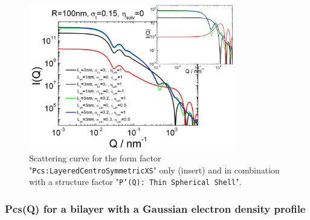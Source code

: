 \begin{figure}[htb]
\begin{center}
\includegraphics[width=0.8\textwidth,height=0.55\textwidth]{../images/form_factor/anisotropic/Pcs_planar2centrosymmIQ.png}
\end{center}
\caption{Scattering curve for the form factor "\texttt{Pcs:LayeredCentroSymmetricXS}" only (insert) and
in combination with a structure factor "\texttt{P'(Q): Thin Spherical Shell}".}
\label{fig:Pcs_planar2centrosymmIQ}
\end{figure}

\clearpage

\subsubsection{Pcs(Q) for a bilayer with a Gaussian electron density profile} ~\\
\label{plugin:Pcs:GaussianProfile}


